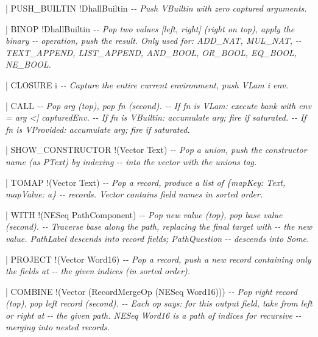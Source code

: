 \documentclass[]{article}
\newenvironment{Shaded}{}{}
\newcommand{\CommentTok}[1]{\textcolor[rgb]{0.38,0.63,0.69}{\textit{#1}}}
\newcommand{\DataTypeTok}[1]{\textcolor[rgb]{0.56,0.13,0.00}{#1}}
\newcommand{\NormalTok}[1]{#1}
\newcommand{\OperatorTok}[1]{\textcolor[rgb]{0.40,0.40,0.40}{#1}}
\begin{document}
\begin{Shaded}
\begin{Highlighting}[]
    \OperatorTok{|} \DataTypeTok{PUSH\_BUILTIN} \OperatorTok{!}\DataTypeTok{DhallBuiltin}
    \CommentTok{{-}{-} Push VBuiltin with zero captured arguments.}

    \OperatorTok{|} \DataTypeTok{BINOP} \OperatorTok{!}\DataTypeTok{DhallBuiltin}
    \CommentTok{{-}{-} Pop two values [left, right] (right on top), apply the binary}
    \CommentTok{{-}{-} operation, push the result. Only used for: ADD\_NAT, MUL\_NAT,}
    \CommentTok{{-}{-} TEXT\_APPEND, LIST\_APPEND, AND\_BOOL, OR\_BOOL, EQ\_BOOL, NE\_BOOL.}

    \OperatorTok{|} \DataTypeTok{CLOSURE}\NormalTok{ i}
    \CommentTok{{-}{-} Capture the entire current environment, push VLam i env.}

    \OperatorTok{|} \DataTypeTok{CALL}
    \CommentTok{{-}{-} Pop arg (top), pop fn (second).}
    \CommentTok{{-}{-} If fn is VLam: execute bank with env = arg \textless{}| capturedEnv.}
    \CommentTok{{-}{-} If fn is VBuiltin: accumulate arg; fire if saturated.}
    \CommentTok{{-}{-} If fn is VProvided: accumulate arg; fire if saturated.}

    \OperatorTok{|} \DataTypeTok{SHOW\_CONSTRUCTOR} \OperatorTok{!}\NormalTok{(}\DataTypeTok{Vector} \DataTypeTok{Text}\NormalTok{)}
    \CommentTok{{-}{-} Pop a union, push the constructor name (as PText) by indexing}
    \CommentTok{{-}{-} into the vector with the union\textquotesingle{}s tag.}

    \OperatorTok{|} \DataTypeTok{TOMAP} \OperatorTok{!}\NormalTok{(}\DataTypeTok{Vector} \DataTypeTok{Text}\NormalTok{)}
    \CommentTok{{-}{-} Pop a record, produce a list of \{mapKey: Text, mapValue: a\}}
    \CommentTok{{-}{-} records. Vector contains field names in sorted order.}

    \OperatorTok{|} \DataTypeTok{WITH} \OperatorTok{!}\NormalTok{(}\DataTypeTok{NESeq} \DataTypeTok{PathComponent}\NormalTok{)}
    \CommentTok{{-}{-} Pop new value (top), pop base value (second).}
    \CommentTok{{-}{-} Traverse base along the path, replacing the final target with}
    \CommentTok{{-}{-} the new value. PathLabel descends into record fields; PathQuestion}
    \CommentTok{{-}{-} descends into Some.}

    \OperatorTok{|} \DataTypeTok{PROJECT} \OperatorTok{!}\NormalTok{(}\DataTypeTok{Vector} \DataTypeTok{Word16}\NormalTok{)}
    \CommentTok{{-}{-} Pop a record, push a new record containing only the fields at}
    \CommentTok{{-}{-} the given indices (in sorted order).}

    \OperatorTok{|} \DataTypeTok{COMBINE} \OperatorTok{!}\NormalTok{(}\DataTypeTok{Vector}\NormalTok{ (}\DataTypeTok{RecordMergeOp}\NormalTok{ (}\DataTypeTok{NESeq} \DataTypeTok{Word16}\NormalTok{)))}
    \CommentTok{{-}{-} Pop right record (top), pop left record (second).}
    \CommentTok{{-}{-} Each op says: for this output field, take from left or right at}
    \CommentTok{{-}{-} the given path. NESeq Word16 is a path of indices for recursive}
    \CommentTok{{-}{-} merging into nested records.}


\end{Highlighting}
\end{Shaded}
\end{document}
